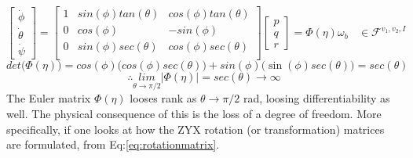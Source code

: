 \begin{equation}\label{eq:euler-derivative}
\begin{bmatrix}
\dot{\phi}\\
\dot{\theta}\\
\dot{\psi}
\end{bmatrix}
=\begin{bmatrix}
1 & sin(\phi)tan(\theta) & cos(\phi)tan(\theta)\\
0 & cos(\phi) & -sin(\phi)\\
0 & sin(\phi)sec(\theta) & cos(\phi)sec(\theta)\\
\end{bmatrix}
\begin{bmatrix}
p\\
q\\
r
\end{bmatrix}
=\Phi(\eta)\omega_b~~~~\in\mathcal{F}^{v_1,v_2,I}
\end{equation}
\vspace{-2pt}
\begin{equation}
det\big(\Phi(\eta)\big)=cos(\phi)\big(cos(\phi)sec(\theta)\big)+sin(\phi)\big(\sin(\phi)sec(\theta)\big)=sec(\theta)
\end{equation}
\vspace{-6pt}
\begin{equation}
\therefore \underset{{\theta \rightarrow \pi /2}}{lim}|\Phi(\eta)|=sec(\theta)\rightarrow \infty
\end{equation}
The Euler matrix $\Phi(\eta)$ looses rank as $\theta\rightarrow\pi/2$ rad, loosing differentiability as well. The physical consequence of this is the loss of a degree of freedom. More specifically, if one looks at how the ZYX rotation (or transformation) matrices are formulated, from Eq:\ref{eq:rotationmatrix}.
